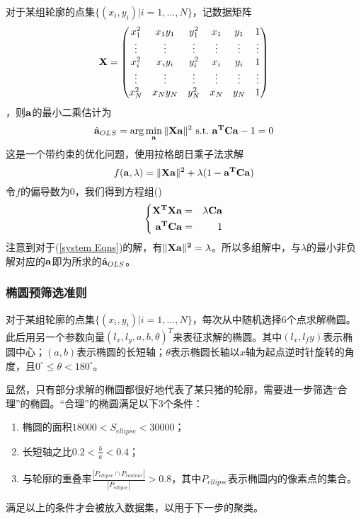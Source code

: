 对于某组轮廓的点集$\{(x_i, y_i)|i=1,\dots, N \}$，记数据矩阵
\begin{equation}
    \bf X = \begin{pmatrix}
        x_1^2 & x_1y_1 & y_1^2 & x_1 & y_1 & 1 \\
        \vdots & \vdots & \vdots & \vdots & \vdots & \vdots \\
        x_i^2 & x_iy_i & y_i^2 & x_i & y_i & 1 \\
        \vdots & \vdots & \vdots & \vdots & \vdots & \vdots \\
        x_N^2 & x_Ny_N & y_N^2 & x_N & y_N & 1 \\
    \end{pmatrix} 
\end{equation}
，则$\bf a$的最小二乘估计为
\begin{equation}
    \hat {\bf a}_{OLS} = \arg \min_{\bf a} \|{\bf X a }\|^2 \ \text{s.t.} \ {\bf a^T C a} - 1 = 0
\end{equation}
这是一个带约束的优化问题，使用拉格朗日乘子法求解
\begin{equation}
    f({\bf a}, \lambda) = \|{\bf Xa}\|^2 + \lambda (1 - {\bf a^T C a}) 
\end{equation}
令$f$的偏导数为0，我们得到方程组(\label{system Eqns})
\begin{equation}
    \left\{
    \begin{aligned}
        {\bf X^T X a} &=& \lambda {\bf Ca} \\
        {\bf a^T C a} &=& 1  
    \end{aligned}
    \right.
    \label{system Eqns} 
\end{equation}
注意到对于(\ref{system Eqns})的解，有$\|\bf{X a}\|^2 = \lambda$。所以多组解中，与$\lambda$的最小非负解对应的$\bf a$即为所求的$\hat {\bf a}_{OLS}$。

\subsubsection{椭圆预筛选准则}
对于某组轮廓的点集$\{(x_i, y_i)|i=1,\dots, N \}$，每次从中随机选择6个点求解椭圆。此后用另一个参数向量$(l_x, l_y, a, b, \theta)^T$来表征求解的椭圆。其中$(l_x,l_fy)$表示椭圆中心；$(a,b)$表示椭圆的长短轴；$\theta$表示椭圆长轴以$x$轴为起点逆时针旋转的角度，且$0^{\circ} \leq \theta < 180^{\circ}$。

显然，只有部分求解的椭圆都很好地代表了某只猪的轮廓，需要进一步筛选“合理”的椭圆。“合理”的椭圆满足以下3个条件：
\begin{enumerate}
    \item 椭圆的面积$18000<S_{ellipse}<30000$；
    \item 长短轴之比$0.2<\frac{b}{a}<0.4$；
    \item 与轮廓的重叠率$\frac{|P_{ellipse} \cap P_{contour}|}{|P_{ellipse}|}>0.8$，其中$P_{ellipse}$表示椭圆内的像素点的集合。
\end{enumerate}
满足以上的条件才会被放入数据集，以用于下一步的聚类。

